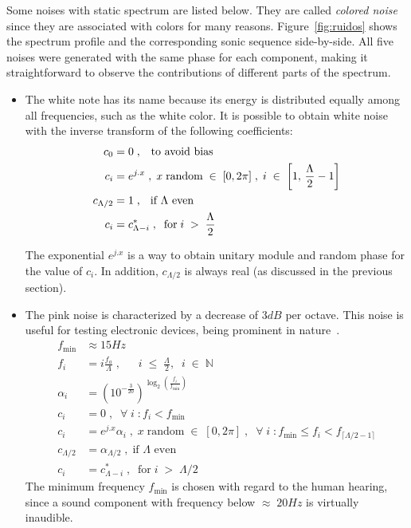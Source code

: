 Some noises with static spectrum are listed below. They are called \emph{colored noise} since they are associated with colors for many reasons.
Figure~\ref{fig:ruidos} shows the spectrum profile and the corresponding sonic sequence side-by-side. All five noises were generated with the same phase for each component, making it straightforward to observe the contributions of different parts of the spectrum.

\begin{itemize}
 \item The white note has its name because its energy is distributed equally among all frequencies, such as the white color. It is possible to obtain white noise with the inverse transform of the following coefficients:
\begin{equation}\label{eq:branco}
 \begin{split}
 c_0 & =0 \;\text{,\quad to avoid bias} \\
 c_i & =e^{j.x}\;,\; x \; \text{random} \; \in \; [0,2\pi]\;,\; i \; \in \; \left[1, \, \frac{\Lambda}{2}-1\right] \\
 c_{\Lambda/2} & = 1 \; \text{, \; if $\Lambda$ even}\\ 
 c_i & = c_{\Lambda - i}^*\;,\;\; \text{for}\;  i \; > \;  \frac{\Lambda}{2}
 \end{split}
\end{equation}

The exponential $e^{j.x}$ is a way to obtain unitary module and random phase for the value of $c_i$. In addition, $c_{\Lambda/2}$ is always real (as discussed in the previous section).

 \item The pink noise is characterized by a decrease of $3dB$ per octave. This noise is useful for testing electronic devices, being prominent in nature~\cite{Roederer}. 
\begin{equation}\label{eq:rosa}
\begin{split}
	f_{\text{min}} & \approx 15 Hz \\
	f_i  &= i \frac{f_a}{\Lambda} \;, \;\; \quad i \;\leq\; \frac{\Lambda}{2},\;\; i\;\in\;\mathbb{N}  \\
	\alpha_i & = \left(10^{-\frac{3}{20}}\right)^{\log _2 \left ( \frac{f_i}{f_{\text{min}}} \right )}  \\
	c_i & =0\;,\;\; \forall \; i \; : f_i<f_{\text{min}} \\
	c_i & =e^{j.x} \alpha_i\;, \; x \; \text{random} \; \in \; [0,2\pi]\;,\;\; \forall \; i \; : f_{\text{min}} \le f_i < f_{\lceil \Lambda/2-1 \rceil}  \\
	c_{\Lambda/2} & = \alpha_{\Lambda/2}\;, \; \text{if $\Lambda$ even} \\ 
	c_i & = c_{\Lambda - i}^*\;,\;\; \text{for}\;  i \; > \;  \Lambda/2 \qquad \qquad
\end{split}
\end{equation}
The minimum frequency $f_{\text{min}}$ is chosen with regard to the human hearing, since a sound component with frequency below $\approx\; 20Hz$ is virtually inaudible.


\end{itemize}
